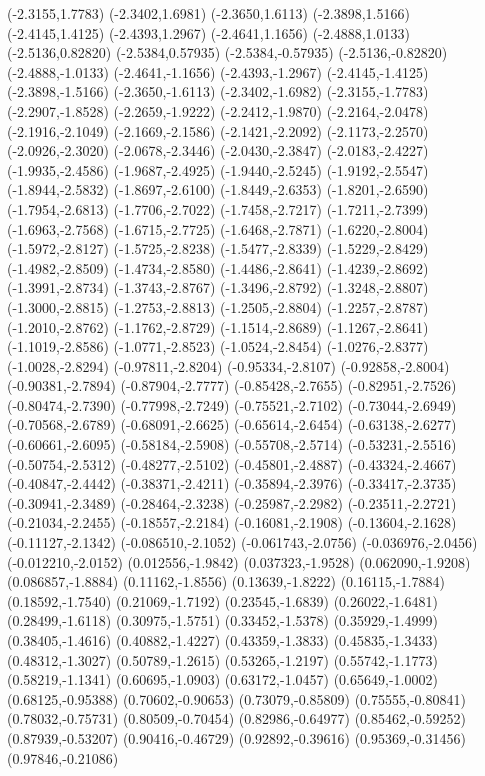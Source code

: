 \documentclass[11pt]{report}
\begin{document}
\begin{center}
  (-2.3155,1.7783)
  (-2.3402,1.6981)
  (-2.3650,1.6113)
  (-2.3898,1.5166)
  (-2.4145,1.4125)
  (-2.4393,1.2967)
  (-2.4641,1.1656)
  (-2.4888,1.0133)
  (-2.5136,0.82820)
  (-2.5384,0.57935)
  (-2.5384,-0.57935)
  (-2.5136,-0.82820)
  (-2.4888,-1.0133)
  (-2.4641,-1.1656)
  (-2.4393,-1.2967)
  (-2.4145,-1.4125)
  (-2.3898,-1.5166)
  (-2.3650,-1.6113)
  (-2.3402,-1.6982)
  (-2.3155,-1.7783)
  (-2.2907,-1.8528)
  (-2.2659,-1.9222)
  (-2.2412,-1.9870)
  (-2.2164,-2.0478)
  (-2.1916,-2.1049)
  (-2.1669,-2.1586)
  (-2.1421,-2.2092)
  (-2.1173,-2.2570)
  (-2.0926,-2.3020)
  (-2.0678,-2.3446)
  (-2.0430,-2.3847)
  (-2.0183,-2.4227)
  (-1.9935,-2.4586)
  (-1.9687,-2.4925)
  (-1.9440,-2.5245)
  (-1.9192,-2.5547)
  (-1.8944,-2.5832)
  (-1.8697,-2.6100)
  (-1.8449,-2.6353)
  (-1.8201,-2.6590)
  (-1.7954,-2.6813)
  (-1.7706,-2.7022)
  (-1.7458,-2.7217)
  (-1.7211,-2.7399)
  (-1.6963,-2.7568)
  (-1.6715,-2.7725)
  (-1.6468,-2.7871)
  (-1.6220,-2.8004)
  (-1.5972,-2.8127)
  (-1.5725,-2.8238)
  (-1.5477,-2.8339)
  (-1.5229,-2.8429)
  (-1.4982,-2.8509)
  (-1.4734,-2.8580)
  (-1.4486,-2.8641)
  (-1.4239,-2.8692)
  (-1.3991,-2.8734)
  (-1.3743,-2.8767)
  (-1.3496,-2.8792)
  (-1.3248,-2.8807)
  (-1.3000,-2.8815)
  (-1.2753,-2.8813)
  (-1.2505,-2.8804)
  (-1.2257,-2.8787)
  (-1.2010,-2.8762)
  (-1.1762,-2.8729)
  (-1.1514,-2.8689)
  (-1.1267,-2.8641)
  (-1.1019,-2.8586)
  (-1.0771,-2.8523)
  (-1.0524,-2.8454)
  (-1.0276,-2.8377)
  (-1.0028,-2.8294)
  (-0.97811,-2.8204)
  (-0.95334,-2.8107)
  (-0.92858,-2.8004)
  (-0.90381,-2.7894)
  (-0.87904,-2.7777)
  (-0.85428,-2.7655)
  (-0.82951,-2.7526)
  (-0.80474,-2.7390)
  (-0.77998,-2.7249)
  (-0.75521,-2.7102)
  (-0.73044,-2.6949)
  (-0.70568,-2.6789)
  (-0.68091,-2.6625)
  (-0.65614,-2.6454)
  (-0.63138,-2.6277)
  (-0.60661,-2.6095)
  (-0.58184,-2.5908)
  (-0.55708,-2.5714)
  (-0.53231,-2.5516)
  (-0.50754,-2.5312)
  (-0.48277,-2.5102)
  (-0.45801,-2.4887)
  (-0.43324,-2.4667)
  (-0.40847,-2.4442)
  (-0.38371,-2.4211)
  (-0.35894,-2.3976)
  (-0.33417,-2.3735)
  (-0.30941,-2.3489)
  (-0.28464,-2.3238)
  (-0.25987,-2.2982)
  (-0.23511,-2.2721)
  (-0.21034,-2.2455)
  (-0.18557,-2.2184)
  (-0.16081,-2.1908)
  (-0.13604,-2.1628)
  (-0.11127,-2.1342)
  (-0.086510,-2.1052)
  (-0.061743,-2.0756)
  (-0.036976,-2.0456)
  (-0.012210,-2.0152)
  (0.012556,-1.9842)
  (0.037323,-1.9528)
  (0.062090,-1.9208)
  (0.086857,-1.8884)
  (0.11162,-1.8556)
  (0.13639,-1.8222)
  (0.16115,-1.7884)
  (0.18592,-1.7540)
  (0.21069,-1.7192)
  (0.23545,-1.6839)
  (0.26022,-1.6481)
  (0.28499,-1.6118)
  (0.30975,-1.5751)
  (0.33452,-1.5378)
  (0.35929,-1.4999)
  (0.38405,-1.4616)
  (0.40882,-1.4227)
  (0.43359,-1.3833)
  (0.45835,-1.3433)
  (0.48312,-1.3027)
  (0.50789,-1.2615)
  (0.53265,-1.2197)
  (0.55742,-1.1773)
  (0.58219,-1.1341)
  (0.60695,-1.0903)
  (0.63172,-1.0457)
  (0.65649,-1.0002)
  (0.68125,-0.95388)
  (0.70602,-0.90653)
  (0.73079,-0.85809)
  (0.75555,-0.80841)
  (0.78032,-0.75731)
  (0.80509,-0.70454)
  (0.82986,-0.64977)
  (0.85462,-0.59252)
  (0.87939,-0.53207)
  (0.90416,-0.46729)
  (0.92892,-0.39616)
  (0.95369,-0.31456)
  (0.97846,-0.21086)
  \endpspicture
\end{center}
\vspace{2ex}
\end{document}
